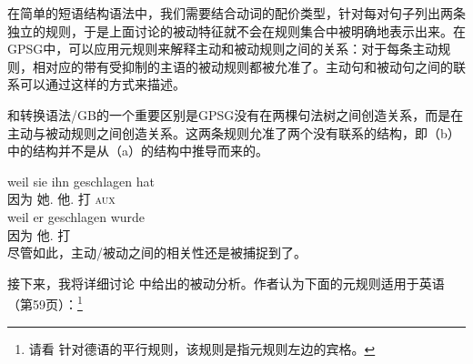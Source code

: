 \noindent
在简单的短语结构语法中，我们需要结合动词的配价类型，针对每对句子列出两条独立的规则，于是上面讨论的被动特征就不会在规则集合中被明确地表示出来。在GPSG中，可以应用元规则来解释主动和被动规则之间的关系：对于每条主动规则，相对应的带有受抑制的主语的被动规则都被允准了。主动句和被动句之间的联系可以通过这样的方式来描述。

和转换语法/GB\indexgbc\indexmpc 的一个重要区别是GPSG没有在两棵句法树之间创造关系，而是在主动与被动规则之间创造关系。这两条规则允准了两个没有联系的结构，即（b）中的结构并不是从（a）的结构中推导而来的。

\eal
\ex 
\gll weil sie ihn geschlagen hat\\
     因为 她.\nom{} 他.\acc{} 打 \textsc{aux}\\
\ex 
\gll weil er geschlagen wurde\\
     因为 他.\nom{} 打 \passivepst\\
\zl
%
尽管如此，主动/被动之间的相关性还是被捕捉到了。

接下来，我将详细讨论 中给出的被动分析。作者认为下面的元规则适用于英语（第59页）：\footnote{%
请看 针对德语的平行规则，该规则是指元规则左边的宾格。
}

